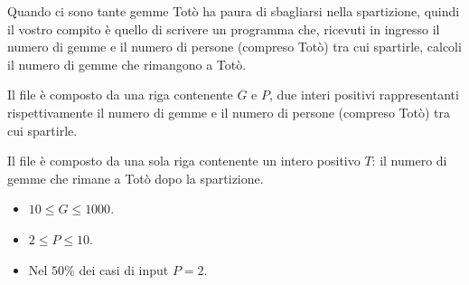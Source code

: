 Quando ci sono tante gemme Totò ha paura di sbagliarsi nella spartizione, quindi il vostro compito è quello di scrivere un programma che, ricevuti in ingresso il numero di gemme e il numero di persone (compreso Totò) tra cui spartirle, calcoli il numero di gemme che rimangono a Totò.

\Input
Il file  è composto da una riga contenente $G$ e $P$, due interi positivi rappresentanti rispettivamente il numero di gemme e il numero di persone (compreso Totò) tra cui spartirle.

\Output
Il file \outputfile{} è composto da una sola riga contenente un
intero positivo $T$: il numero di gemme che rimane a Totò dopo la spartizione.

\pagebreak
\Constraints
\begin{itemize}[nolistsep, itemsep=2mm]
  \item $10 \le G \le 1000$.
  \item $2 \le P \le 10$.
  \item Nel $50\%$ dei casi di input $P=2$.
\end{itemize}

\Examples
\begin{example}
%
%
\end{example}
